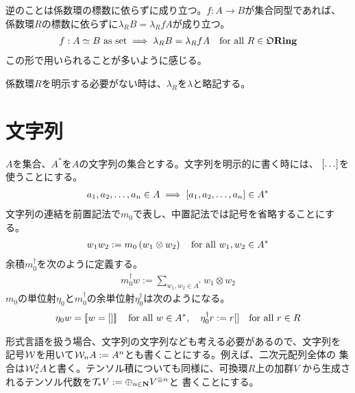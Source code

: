 {	逆のことは係数環の標数に依らずに成り立つ。$f:A\to B$が集合同型であれば、
	係数環$R$の標数に依らずに$\lambda_R B=\lambda_R fA$が成り立つ。
	\begin{equation*}\begin{split}
		f:A\simeq B \text{ as set} \implies \lambda_R B=\lambda_R fA
		\quad\text{for all } R\in{\mathfrak{O}}{\mathbf{Ring}}
	\end{split}\end{equation*}
	この形で用いられることが多いように感じる。

	係数環$R$を明示する必要がない時は、$\lambda_R$を$\lambda$と略記する。
\section{文字列}\label{s1:文字列} %
	$A$を集合、$A^*$を$A$の文字列の集合とする。文字列を明示的に書く時には、
	${\mathinner{\left[{\dots}\right]}}$を使うことにする。
	\begin{equation*}\begin{split}
		a_1,a_2,\dots,a_n\in A\implies {\mathinner{\left[{a_1,a_2,\dots,a_n}\right]}}\in A^* 
	\end{split}\end{equation*}
	文字列の連結を前置記法で$m_0$で表し、中置記法では記号を省略することにする。
	\begin{equation*}\begin{split}
		w_1w_2 := m_0\mathinner{({w_1\otimes w_2})} \quad\text{for all } w_1,w_2\in A^*
	\end{split}\end{equation*}
	余積$m_0^\dag$を次のように定義する。
	\begin{equation*}\begin{split}
		m_0^\dag w := \sum_{w_1,w_2\in A^*} w_1\otimes w_2
	\end{split}\end{equation*}
	$m_0$の単位射$\eta_0$と$m_0^\dag$の余単位射$\eta_0^\dag$は次のようになる。
	\begin{equation*}\begin{split}
		\eta_0 w = \mathinner{[\![w={\mathinner{\left[{}\right]}}]\!]} \quad\text{for all } w\in A^*,\quad
		\eta_0^\dag r := r{\mathinner{\left[{}\right]}} \quad\text{for all } r\in R
	\end{split}\end{equation*}

	形式言語を扱う場合、文字列の文字列なども考える必要があるので、文字列を
	記号${\mathcal{W}}$を用いて${\mathcal{W}}_nA:=A^n$とも書くことにする。例えば、二次元配列全体の
	集合は${\mathcal{W}}_*^2A$と書く。テンソル積についても同様に、可換環$R$上の加群$V$
	から生成されるテンソル代数を${\mathcal{T}}_*V:=\oplus_{n\in\mathbf{N}}V^{\otimes n}$と
	書くことにする。
}
